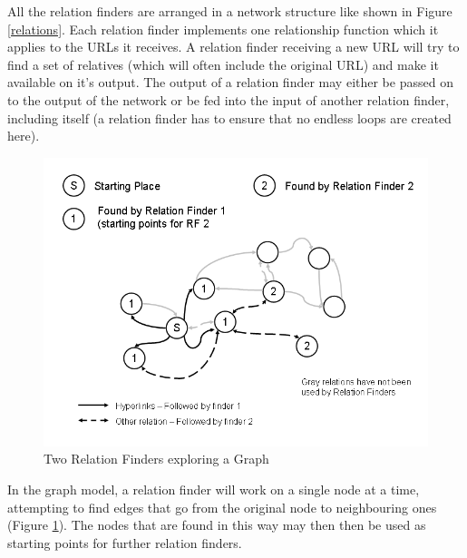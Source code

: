 \documentclass[a4paper,twoside]{danarticle}
\theoremstyle{remark}
\begin{document}
       All the relation finders are arranged in a network structure like shown in 
       Figure \ref{relations}. Each relation finder implements one relationship
       function which it applies to the URLs it receives. A relation finder
       receiving a new URL will try to find a set of relatives (which will often
       include the original URL) and make it available on it's output. The
       output of a relation finder may either be passed on to the output of the
       network or be fed into the input of another relation finder, including
       itself (a relation finder has to ensure that no endless loops are created
       here).
       
       \begin{figure}[ht]
        \centering
        \includegraphics[width=12cm]{relationsteps}
        \caption{Two Relation Finders exploring a Graph}
        \label{relationsteps}
      \end{figure}
       
       In the graph model, a relation finder will work on a single node at a 
       time, attempting to find edges that go from the original node to 
       neighbouring ones (Figure \ref{relationsteps}). 
       The nodes that are found in this way may then then be 
       used as starting points for further relation finders.
\end{document}
